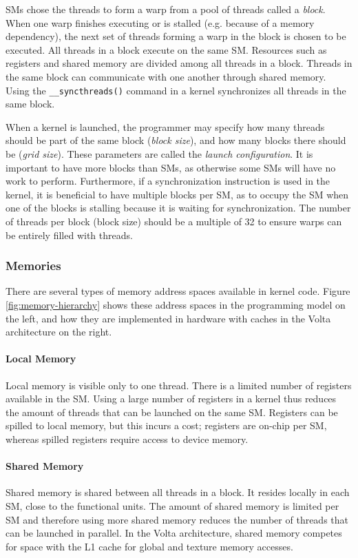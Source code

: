 SMs chose the threads to form a warp from a pool of threads called a \emph{block}. When one warp finishes executing or is stalled (e.g. because of a memory dependency), the next set of threads forming a warp in the block is chosen to be executed. All threads in a block execute on the same SM. Resources such as registers and shared memory are divided among all threads in a block. Threads in the same block can communicate with one another through shared memory. Using the \texttt{\_\_syncthreads()} command in a kernel synchronizes all threads in the same block.

When a kernel is launched, the programmer may specify how many threads should be part of the same block (\emph{block size}), and how many blocks there should be (\emph{grid size}). These parameters are called the \emph{launch configuration}. It is important to have more blocks than SMs, as otherwise some SMs will have no work to perform. Furthermore, if a synchronization instruction is used in the kernel, it is beneficial to have multiple blocks per SM, as to occupy the SM when one of the blocks is stalling because it is waiting for synchronization. The number of threads per block (block size) should be a multiple of 32 to ensure warps can be entirely filled with threads. \cite[Section~10]{cuda-best-practices}

\subsubsection{Memories} \label{sec:memories}

There are several types of memory address spaces available in kernel code. Figure \ref{fig:memory-hierarchy} shows these address spaces in the programming model on the left, and how they are implemented in hardware with caches in the Volta architecture on the right. 

\paragraph{Local Memory}
Local memory is visible only to one thread. There is a limited number of registers available in the SM. Using a large number of registers in a kernel thus reduces the amount of threads that can be launched on the same SM. Registers can be spilled to local memory, but this incurs a cost; registers are on-chip per SM, whereas spilled registers require access to device memory.

\paragraph{Shared Memory}
Shared memory is shared between all threads in a block. It resides locally in each SM, close to the functional units. The amount of shared memory is limited per SM and therefore using more shared memory reduces the number of threads that can be launched in parallel. In the Volta architecture, shared memory competes for space with the L1 cache for global and texture memory accesses.

